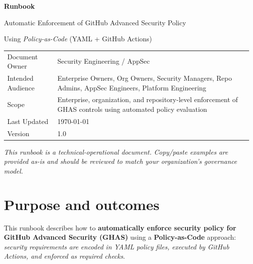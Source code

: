 \documentclass[11pt]{article}
\begin{document}
\begin{titlepage}
  \centering
  \vspace*{1.2in}
  {\Huge \bfseries Runbook \par}
  \vspace{0.2in}
  {\LARGE Automatic Enforcement of GitHub Advanced Security Policy \par}
  \vspace{0.15in}
  {\Large Using \textit{Policy-as-Code} (YAML + GitHub Actions) \par}
  \vspace{0.6in}

  \begin{minipage}{0.9\textwidth}
  \small
  \begin{tabular}{@{}p{}p{}@{}}
    \toprule
    Document Owner & Security Engineering / AppSec \\
    Intended Audience & Enterprise Owners, Org Owners, Security Managers, Repo Admins, AppSec Engineers, Platform Engineering \\
    Scope & Enterprise, organization, and repository-level enforcement of GHAS controls using automated policy evaluation \\
    Last Updated & \today \\
    Version & 1.0 \\
    \bottomrule
  \end{tabular}
  \end{minipage}

  \vfill
  {\small \textit{This runbook is a technical-operational document. Copy/paste examples are provided as-is and should be reviewed to match your organization’s governance model.} \par}
\end{titlepage}

\tableofcontents
\newpage

\section{Purpose and outcomes}

This runbook describes how to \textbf{automatically enforce security policy for GitHub Advanced Security (GHAS)} using a \textbf{Policy-as-Code} approach: \textit{security requirements are encoded in YAML policy files, executed by GitHub Actions, and enforced as required checks}.
\end{document}
